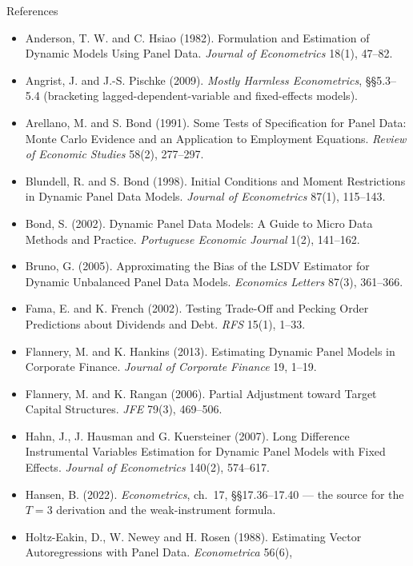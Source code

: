 \documentclass[
  11pt,
  ignorenonframetext,
  aspectratio=169,
]{beamer}
\providecommand{\tightlist}{%
  \setlength{\itemsep}{0pt}\setlength{\parskip}{0pt}}
\begin{document}
\begin{frame}{References}
\protect{}\label{references}
\tiny

\begin{itemize}
\tightlist
\item
  Anderson, T. W. and C. Hsiao (1982). Formulation and Estimation of
  Dynamic Models Using Panel Data. \emph{Journal of Econometrics} 18(1),
  47--82.
\item
  Angrist, J. and J.-S. Pischke (2009). \emph{Mostly Harmless
  Econometrics}, §§5.3--5.4 (bracketing lagged-dependent-variable and
  fixed-effects models).
\item
  Arellano, M. and S. Bond (1991). Some Tests of Specification for Panel
  Data: Monte Carlo Evidence and an Application to Employment Equations.
  \emph{Review of Economic Studies} 58(2), 277--297.
\item
  Blundell, R. and S. Bond (1998). Initial Conditions and Moment
  Restrictions in Dynamic Panel Data Models. \emph{Journal of
  Econometrics} 87(1), 115--143.
\item
  Bond, S. (2002). Dynamic Panel Data Models: A Guide to Micro Data
  Methods and Practice. \emph{Portuguese Economic Journal} 1(2),
  141--162.
\item
  Bruno, G. (2005). Approximating the Bias of the LSDV Estimator for
  Dynamic Unbalanced Panel Data Models. \emph{Economics Letters} 87(3),
  361--366.
\item
  Fama, E. and K. French (2002). Testing Trade-Off and Pecking Order
  Predictions about Dividends and Debt. \emph{RFS} 15(1), 1--33.
\item
  Flannery, M. and K. Hankins (2013). Estimating Dynamic Panel Models in
  Corporate Finance. \emph{Journal of Corporate Finance} 19, 1--19.
\item
  Flannery, M. and K. Rangan (2006). Partial Adjustment toward Target
  Capital Structures. \emph{JFE} 79(3), 469--506.
\item
  Hahn, J., J. Hausman and G. Kuersteiner (2007). Long Difference
  Instrumental Variables Estimation for Dynamic Panel Models with Fixed
  Effects. \emph{Journal of Econometrics} 140(2), 574--617.
\item
  Hansen, B. (2022). \emph{Econometrics}, ch.~17, §§17.36--17.40 --- the
  source for the \(T=3\) derivation and the weak-instrument formula.
\item
  Holtz-Eakin, D., W. Newey and H. Rosen (1988). Estimating Vector
  Autoregressions with Panel Data. \emph{Econometrica} 56(6),

\end{itemize}
\end{frame}
\end{document}
